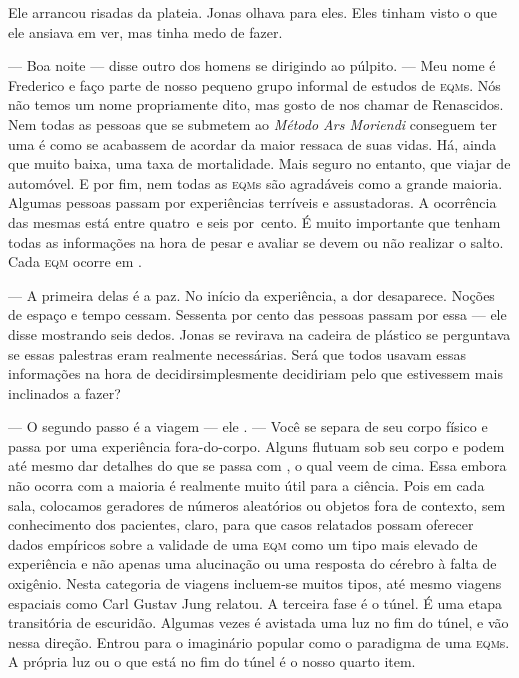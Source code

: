 Ele arrancou risadas da plateia. Jonas olhava  para eles. Eles tinham visto o que ele ansiava em ver, mas tinha medo de fazer.

--- Boa noite --- disse outro dos homens se dirigindo ao púlpito. --- Meu nome é Frederico e faço parte de nosso pequeno grupo informal de estudos de \textsc{eqm}s. Nós não temos um nome propriamente dito, mas gosto de nos chamar de Renascidos. Nem todas as pessoas que se submetem ao \emph{Método Ars Moriendi} conseguem ter uma  é como se acabassem de acordar da maior ressaca de suas vidas. Há, ainda que muito baixa, uma taxa de mortalidade. Mais seguro\mudanca{,} no entanto, que viajar de automóvel. E\mudanca{,} por fim, nem todas as \textsc{eqm}s são agradáveis como a grande maioria. Algumas pessoas passam por experiências terríveis e assustadoras. A ocorrência das mesmas está entre quatro~e seis por~cento. É muito importante que tenham todas as informações na hora de pesar e avaliar se devem ou não realizar o salto. Cada \textsc{eqm} ocorre em .

--- A primeira delas é a paz. No início da experiência, a dor desaparece. Noções de espaço e tempo cessam. Sessenta por cento das pessoas passam por essa --- ele disse mostrando seis dedos. Jonas se revirava na cadeira de plástico\mudanca{,} se perguntava se essas palestras eram realmente necessárias. Será que todos usavam essas informações na hora de decidirsimplesmente decidiriam pelo que estivessem mais inclinados a fazer?

--- O segundo passo é a viagem --- ele . --- Você se separa de seu corpo físico e passa por uma experiência fora-do-corpo. Alguns flutuam sob seu corpo e podem até mesmo dar detalhes do que se passa com , o qual veem de cima. Essa embora não ocorra com a maioria\mudanca{,} é realmente muito útil para a ciência. Pois\mudanca{,} em cada sala, colocamos geradores de números aleatórios ou objetos fora de contexto, sem conhecimento dos pacientes, claro, para que casos relatados possam oferecer dados empíricos sobre a validade de uma \textsc{eqm} como um tipo mais elevado de experiência\mudanca{,} e não apenas uma alucinação ou uma resposta do cérebro à falta de oxigênio. Nesta categoria de viagens\mudanca{,} incluem-se muitos tipos, até mesmo viagens espaciais como Carl Gustav Jung relatou. A terceira fase é o túnel. É uma etapa transitória de escuridão. Algumas vezes é avistada uma luz no fim do túnel, e  vão nessa direção. Entrou para o imaginário popular como o paradigma de uma \textsc{eqm}s. A própria luz ou o que está no fim do túnel é o nosso quarto item.

